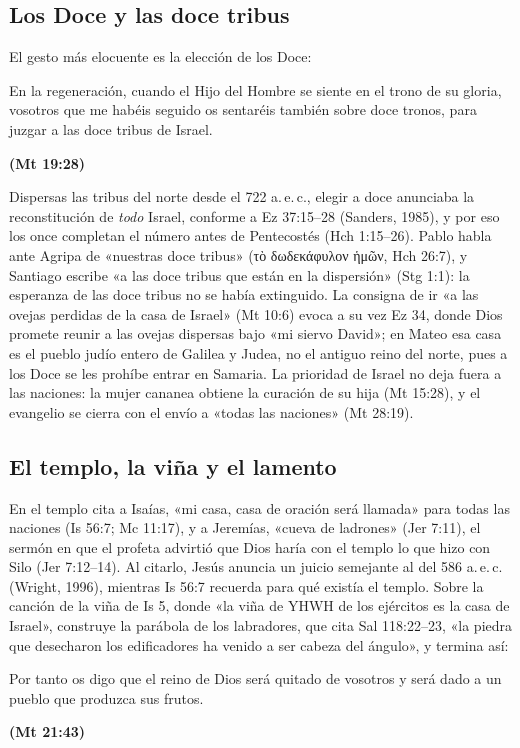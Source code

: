\documentclass[11pt,letterpaper]{article}
\newcommand{\grc}[1]{\foreignlanguage{ancientgreek}{#1}}
\newcommand{\fuente}[1]{\par\hfill{\upshape\bfseries\small\textcolor{ladrillo}{#1}}}
\begin{document}
\subsection{Los Doce y las doce tribus}
El gesto más elocuente es la elección de los Doce:

\begin{cita}En la regeneración, cuando el Hijo del Hombre se siente en el trono de su gloria, vosotros que me habéis seguido os sentaréis también sobre doce tronos, para juzgar a las doce tribus de Israel.\fuente{(Mt 19:28)}\end{cita}

Dispersas las tribus del norte desde el 722 a.\,e.\,c., elegir a doce anunciaba la reconstitución de \emph{todo} Israel, conforme a Ez 37:15--28 (Sanders, 1985), y por eso los once completan el número antes de Pentecostés (Hch 1:15--26). Pablo habla ante Agripa de «nuestras doce tribus» (\grc{τὸ δωδεκάφυλον ἡμῶν}, Hch 26:7), y Santiago escribe «a las doce tribus que están en la dispersión» (Stg 1:1): la esperanza de las doce tribus no se había extinguido. La consigna de ir «a las ovejas perdidas de la casa de Israel» (Mt 10:6) evoca a su vez Ez 34, donde Dios promete reunir a las ovejas dispersas bajo «mi siervo David»; en Mateo esa casa es el pueblo judío entero de Galilea y Judea, no el antiguo reino del norte, pues a los Doce se les prohíbe entrar en Samaria. La prioridad de Israel no deja fuera a las naciones: la mujer cananea obtiene la curación de su hija (Mt 15:28), y el evangelio se cierra con el envío a «todas las naciones» (Mt 28:19).

\subsection{El templo, la viña y el lamento}
En el templo cita a Isaías, «mi casa, casa de oración será llamada» para todas las naciones (Is 56:7; Mc 11:17), y a Jeremías, «cueva de ladrones» (Jer 7:11), el sermón en que el profeta advirtió que Dios haría con el templo lo que hizo con Silo (Jer 7:12--14). Al citarlo, Jesús anuncia un juicio semejante al del 586 a.\,e.\,c. (Wright, 1996), mientras Is 56:7 recuerda para qué existía el templo. Sobre la canción de la viña de Is 5, donde «la viña de YHWH de los ejércitos es la casa de Israel», construye la parábola de los labradores, que cita Sal 118:22--23, «la piedra que desecharon los edificadores ha venido a ser cabeza del ángulo», y termina así:

\begin{cita}Por tanto os digo que el reino de Dios será quitado de vosotros y será dado a un pueblo que produzca sus frutos.\fuente{(Mt 21:43)}\end{cita}
\end{document}

